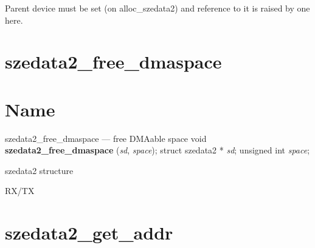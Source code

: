 Parent device must be set (on alloc\_szedata2) and reference to it is raised by one here.
% 
\section*{szedata2\_free\_dmaspace}
\label{API-szedata2-free-dmaspace}\hypertarget{API-szedata2-free-dmaspace}{}%
\label{id245148}

\section*{Name}
szedata2\_free\_dmaspace --- free DMAable space\label{id245158}
\label{id245163}void \textbf{ szedata2\_free\_dmaspace } ({\ttfamily\itshape{{sd}}}, {\ttfamily\itshape{{space}}});
	\newline
	struct szedata2 * {\ttfamily\itshape{{sd}}};
	\newline
	unsigned int {\ttfamily\itshape{{space}}};
\label{id245190}

\begin{kdocdescription}
\item[{{\ttfamily\itshape{{sd}}}}]
szedata2 structure
\item[{{\ttfamily\itshape{{space}}}}]
RX/TX
\end{kdocdescription}
\noindent %
\section*{szedata2\_get\_addr}
\label{API-szedata2-get-addr}\hypertarget{API-szedata2-get-addr}{}%
\label{id245268}

